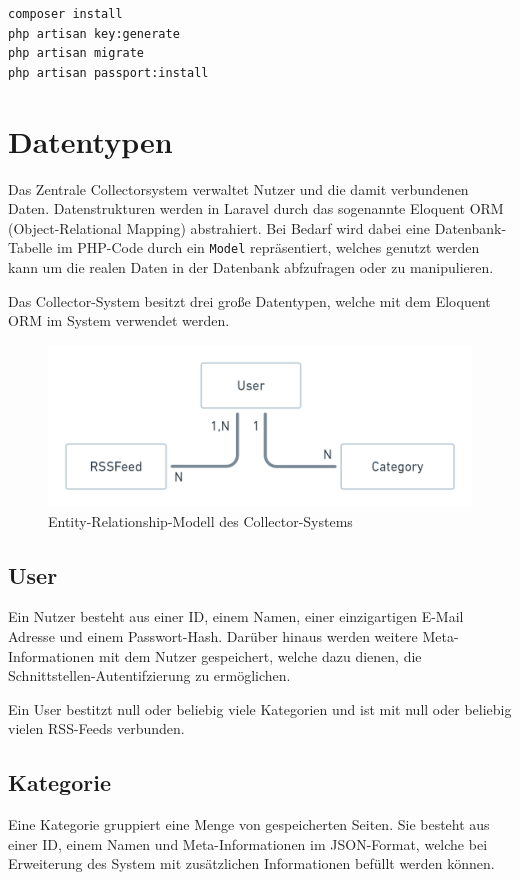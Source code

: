         
        \begin{lstlisting}[caption={Installationsprozess mit Artisan und Composer}]
composer install
php artisan key:generate
php artisan migrate
php artisan passport:install
        \end{lstlisting}

\section{Datentypen}
    Das Zentrale Collectorsystem verwaltet Nutzer und die damit verbundenen Daten.
    Datenstrukturen werden in Laravel durch das sogenannte Eloquent ORM (Object-Relational Mapping) abstrahiert. Bei Bedarf wird dabei eine Datenbank-Tabelle im PHP-Code durch ein \texttt{Model} repräsentiert, welches genutzt werden kann um die realen Daten in der Datenbank abfzufragen oder zu manipulieren.
    
    Das Collector-System besitzt drei große Datentypen, welche mit dem Eloquent ORM im System verwendet werden.
    
    \begin{figure}[h]
        \includegraphics[width=\textwidth]{images/collector-erm.png}
        \caption{Entity-Relationship-Modell des Collector-Systems}
    \end{figure}
    
    \subsection{User}
        Ein Nutzer besteht aus einer ID, einem Namen, einer einzigartigen E-Mail Adresse und einem Passwort-Hash. Darüber hinaus werden weitere Meta-Informationen mit dem Nutzer gespeichert, welche dazu dienen, die Schnittstellen-Autentifzierung zu ermöglichen.
        
        Ein User bestitzt null oder beliebig viele Kategorien und ist mit null oder beliebig vielen RSS-Feeds verbunden.
    \subsection{Kategorie}
        Eine Kategorie gruppiert eine Menge von gespeicherten Seiten. Sie besteht aus einer ID, einem Namen und Meta-Informationen im JSON-Format, welche bei Erweiterung des System mit zusätzlichen Informationen befüllt werden können.
        
